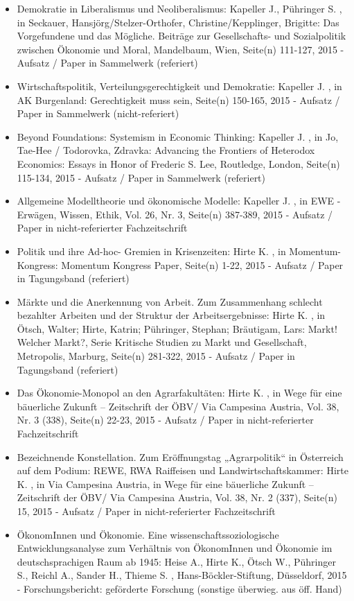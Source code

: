 \begin{itemize}
	 \item Demokratie in Liberalismus und Neoliberalismus: Kapeller J., Pühringer S. , in Seckauer, Hansjörg/Stelzer-Orthofer, Christine/Kepplinger, Brigitte: Das Vorgefundene und das Mögliche. Beiträge zur Gesellschafts- und Sozialpolitik zwischen Ökonomie und Moral, Mandelbaum, Wien, Seite(n) 111-127, 2015 - Aufsatz / Paper in Sammelwerk (referiert)
	 \item Wirtschaftspolitik, Verteilungsgerechtigkeit und Demokratie: Kapeller J. , in AK Burgenland: Gerechtigkeit muss sein, Seite(n) 150-165, 2015 - Aufsatz / Paper in Sammelwerk (nicht-referiert)
	 \item Beyond Foundations: Systemism in Economic  Thinking: Kapeller J. , in Jo, Tae-Hee / Todorovka, Zdravka: Advancing the Frontiers of Heterodox Economics: Essays in Honor of Frederic S. Lee, Routledge, London, Seite(n) 115-134, 2015 - Aufsatz / Paper in Sammelwerk (referiert)
	 \item Allgemeine Modelltheorie und ökonomische Modelle: Kapeller J. , in EWE - Erwägen, Wissen, Ethik, Vol. 26, Nr. 3, Seite(n) 387-389, 2015 - Aufsatz / Paper in nicht-referierter Fachzeitschrift
	 \item Politik und ihre Ad-hoc- Gremien in Krisenzeiten: Hirte K. , in Momentum-Kongress: Momentum Kongress Paper, Seite(n) 1-22, 2015 - Aufsatz / Paper in Tagungsband (referiert)
	 \item Märkte und die Anerkennung von Arbeit. Zum Zusammenhang schlecht bezahlter Arbeiten und der Struktur der Arbeitsergebnisse: Hirte K. , in Ötsch, Walter; Hirte, Katrin; Pühringer, Stephan; Bräutigam, Lars: Markt! Welcher Markt?, Serie Kritische Studien zu Markt und Gesellschaft, Metropolis, Marburg, Seite(n) 281-322, 2015 - Aufsatz / Paper in Tagungsband (referiert)
	 \item Das Ökonomie-Monopol an den Agrarfakultäten: Hirte K. , in Wege für eine bäuerliche Zukunft – Zeitschrift der ÖBV/ Via Campesina Austria, Vol. 38, Nr. 3 (338), Seite(n) 22-23, 2015 - Aufsatz / Paper in nicht-referierter Fachzeitschrift
	 \item Bezeichnende Konstellation. Zum Eröffnungstag „Agrarpolitik“ in Österreich auf dem Podium: REWE, RWA Raiffeisen und Landwirtschaftskammer: Hirte K. , in Via Campesina Austria, in Wege für eine bäuerliche Zukunft – Zeitschrift der ÖBV/ Via Campesina Austria, Vol. 38, Nr. 2 (337), Seite(n) 15, 2015 - Aufsatz / Paper in nicht-referierter Fachzeitschrift
	 \item ÖkonomInnen und Ökonomie. Eine wissenschaftssoziologische Entwicklungsanalyse zum Verhältnis von ÖkonomInnen und Ökonomie im deutschsprachigen Raum ab 1945: Heise A., Hirte K., Ötsch W., Pühringer S., Reichl A., Sander H., Thieme S. , Hans-Böckler-Stiftung, Düsseldorf, 2015 - Forschungsbericht: geförderte Forschung (sonstige überwieg. aus öff. Hand)

\end{itemize}
